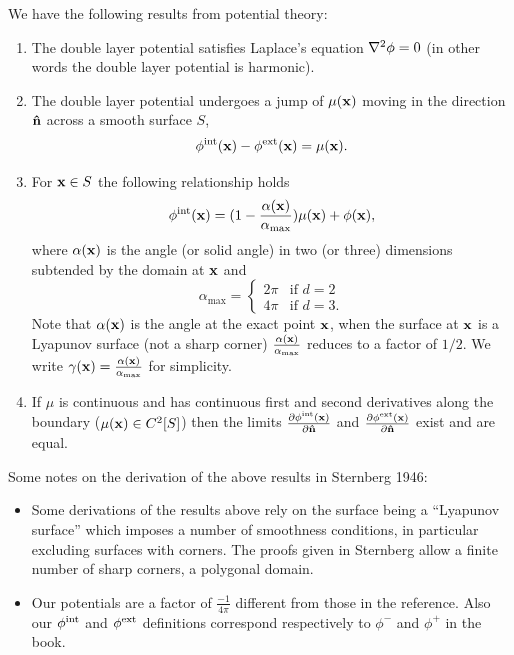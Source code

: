We have the following results from potential theory:\cite{Sternberg1946}
\begin{enumerate}
\item The double layer potential satisfies Laplace's equation $\nabla^2 \phi = 0$ (in other words the double layer potential is harmonic).%

\item The double layer potential undergoes a jump of $\mu(\mathbf{x})$ moving in the direction $\mathbf{\hat{n}}$ across a smooth surface $S$, \ie
  \begin{equation}
    \label{eq:15}
    \phi^{\text{int}}(\mathbf{x}) - \phi^{\text{ext}}(\mathbf{x}) = \mu(\mathbf{x}).
  \end{equation}

\item For $\mathbf{x} \in S$ the following relationship holds
  \begin{equation}
    \phi^{\text{int}}(\mathbf{x}) = (1 - \frac{\alpha(\mathbf{x})}{\alpha_{\text{max}}}) \mu(\mathbf{x}) + \phi(\mathbf{x}),
    \label{eq:22}
  \end{equation}
  where $\alpha(\mathbf{x})$ is the angle (or solid angle) in two (or three) dimensions subtended by the domain at $\mathbf{x}$ and
\begin{equation*}
  \alpha_{\text{max}} =
  \begin{cases}
    2 \pi & \text{if } d=2 \\
    4 \pi & \text{if } d=3.
  \end{cases}\label{eq:16}
\end{equation*}
Note that $\alpha(\mathbf{x})$ is the angle at the exact point $\mathbf{x}$, when the surface at $\mathbf{x}$ is a Lyapunov surface (\ie not a sharp corner) $\frac{\alpha(\mathbf{x})}{\alpha_{\text{max}}}$ reduces to a factor of $1/2$. We write $\gamma(\mathbf{x}) = \frac{\alpha(\mathbf{x})}{\alpha_{\text{max}}}$ for simplicity.

\item If $\mu$ is continuous and has continuous first and second derivatives along the boundary (\ie $\mu(\mathbf{x}) \in C^2[S]$) then the limits $\frac{\partial \phi^{\text{int}}(\mathbf{x})}{\partial \mathbf{\hat{n}}}$ and $\frac{\partial \phi^{\text{ext}}(\mathbf{x})}{\partial \mathbf{\hat{n}}}$ exist and are equal. %

\end{enumerate}

Some notes on the derivation of the above results in Sternberg 1946\cite{Sternberg1946}:
\begin{itemize}
\item Some derivations of the results above rely on the surface being a ``Lyapunov surface'' which imposes a number of smoothness conditions, in particular excluding surfaces with corners.
The proofs given in Sternberg allow a finite number of sharp corners, \ie a polygonal domain.
\item Our potentials are a factor of $\frac{-1}{4 \pi}$ different from those in the reference. Also our $\phi^{\text{int}}$ and $\phi^{\text{ext}}$ definitions correspond respectively to $\phi^-$ and $\phi^+$ in the book.
\end{itemize}


